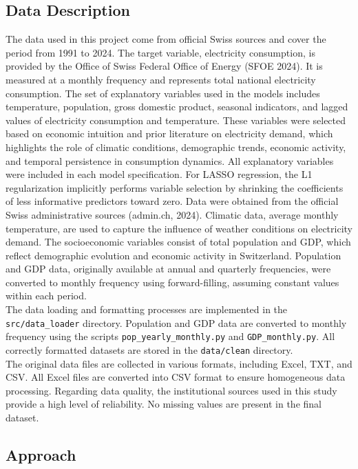\documentclass[11pt,a4paper]{article}
\begin{document}
\subsection{Data Description}
The data used in this project come from official Swiss sources and cover the period from 1991 to 2024. The target variable, electricity consumption, is provided by the Office of Swiss Federal Office of Energy (SFOE 2024). It is measured at a monthly frequency and represents total national electricity consumption.  The set of explanatory variables used in the models includes temperature, population, gross domestic product, seasonal indicators, and lagged values of electricity consumption and temperature. These variables were selected based on economic intuition and prior literature on electricity demand, which highlights the role of climatic conditions, demographic trends, economic activity, and temporal persistence in consumption dynamics. All explanatory variables were included in each model specification. For LASSO regression, the L1 regularization implicitly performs variable selection by shrinking the coefficients of less informative predictors toward zero. Data were obtained from the official Swiss administrative sources (admin.ch, 2024). Climatic data, average monthly temperature, are used to capture the influence of weather conditions on electricity demand. The socioeconomic variables consist of total population and GDP, which reflect demographic evolution and economic activity in Switzerland. Population and GDP data, originally available at annual and quarterly frequencies, were converted to monthly frequency using forward-filling, assuming constant values within each period.\\

The data loading and formatting processes are implemented in the \texttt{src/data\_loader} directory. Population and GDP data are converted to monthly frequency using the scripts \texttt{pop\_yearly\_monthly.py} and \texttt{GDP\_monthly.py}. All correctly formatted datasets are stored in the \texttt{data/clean} directory.\\

The original data files are collected in various formats, including Excel, TXT, and CSV. All Excel files are converted into CSV format to ensure homogeneous data processing. Regarding data quality, the institutional sources used in this study provide a high level of reliability. No missing values are present in the final dataset.

\subsection{Approach}
\end{document}
